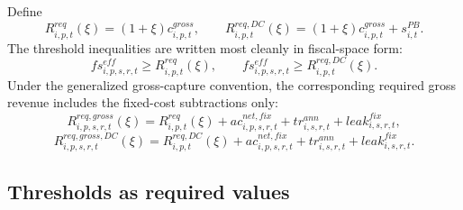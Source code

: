 \documentclass[11pt,a4paper]{article}
\begin{document}
Define
\begin{equation}\label{eq:Rreq_main_v10}
    R^{req}_{i,p,t}(\xi)=(1+\xi)c^{gross}_{i,p,t},
    \qquad
    R^{req,DC}_{i,p,t}(\xi)=(1+\xi)c^{gross}_{i,p,t}+s^{PB}_{i,t}.
\end{equation}
The threshold inequalities are written most cleanly in fiscal-space form:
\begin{equation}\label{eq:effective_thresholds_main_v10}
    fs^{eff}_{i,p,s,r,t}\geq R^{req}_{i,p,t}(\xi),
    \qquad
    fs^{eff}_{i,p,s,r,t}\geq R^{req,DC}_{i,p,t}(\xi).
\end{equation}
Under the generalized gross-capture convention, the corresponding required gross revenue includes the fixed-cost subtractions only:
\begin{equation}\label{eq:gross_req_main_v17}
    R^{req,gross}_{i,p,s,r,t}(\xi)=R^{req}_{i,p,t}(\xi)+ac^{net,fix}_{i,p,s,r,t}+tr^{ann}_{i,s,r,t}+leak^{fix}_{i,s,r,t},
\end{equation}
\begin{equation}\label{eq:gross_req_dc_main_v17}
    R^{req,gross,DC}_{i,p,s,r,t}(\xi)=R^{req,DC}_{i,p,t}(\xi)+ac^{net,fix}_{i,p,s,r,t}+tr^{ann}_{i,s,r,t}+leak^{fix}_{i,s,r,t}.
\end{equation}

\subsection{Thresholds as required values}
\end{document}
